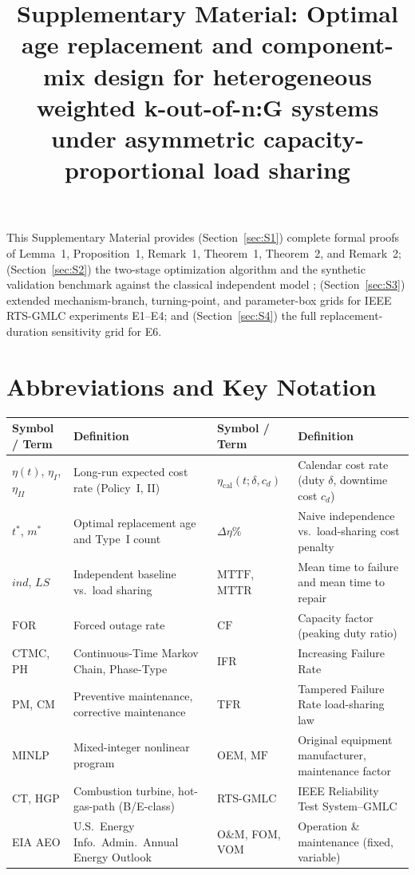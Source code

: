 \documentclass[10pt,a4paper]{article}
\title{\textbf{Supplementary Material: Optimal age replacement and component-mix design for heterogeneous weighted k-out-of-n:G systems under asymmetric capacity-proportional load sharing}}
\author{}
\date{}
\begin{document}
\maketitle

\noindent This Supplementary Material provides (Section~\ref{sec:S1}) complete formal proofs of Lemma~1, Proposition~1, Remark~1, Theorem~1, Theorem~2, and Remark~2; (Section~\ref{sec:S2}) the two-stage optimization algorithm and the synthetic validation benchmark against the classical independent model \cite{wu1994,nakagawa2005,eryilmaz2014two}; (Section~\ref{sec:S3}) extended mechanism-branch, turning-point, and parameter-box grids for IEEE RTS-GMLC experiments E1--E4; and (Section~\ref{sec:S4}) the full replacement-duration sensitivity grid for E6.

\section*{Abbreviations and Key Notation}
\begin{center}
\footnotesize
\begin{tabular*}{\textwidth}{@{\extracolsep{\fill}}ll|ll@{}}
\toprule
Symbol / Term & Definition & Symbol / Term & Definition \\
\midrule
$\eta(t)$, $\eta_I$, $\eta_{II}$ & Long-run expected cost rate (Policy~I, II) & $\eta_{\mathrm{cal}}(t;\delta,c_d)$ & Calendar cost rate (duty $\delta$, downtime cost $c_d$) \\
$t^*$, $m^*$ & Optimal replacement age and Type~I count & $\Delta\eta\%$ & Naive independence vs.\ load-sharing cost penalty \\
$ind$, $LS$ & Independent baseline vs.\ load sharing & $\mathrm{MTTF}$, $\mathrm{MTTR}$ & Mean time to failure and mean time to repair \\
$\mathrm{FOR}$ & Forced outage rate & $\mathrm{CF}$ & Capacity factor (peaking duty ratio) \\
CTMC, PH & Continuous-Time Markov Chain, Phase-Type & IFR & Increasing Failure Rate \\
PM, CM & Preventive maintenance, corrective maintenance & TFR & Tampered Failure Rate load-sharing law \\
MINLP & Mixed-integer nonlinear program & OEM, $\mathrm{MF}$ & Original equipment manufacturer, maintenance factor \\
CT, HGP & Combustion turbine, hot-gas-path (B/E-class) & RTS-GMLC & IEEE Reliability Test System--GMLC \\
EIA AEO & U.S.\ Energy Info.\ Admin.\ Annual Energy Outlook & O\&M, FOM, VOM & Operation \& maintenance (fixed, variable) \\
\bottomrule
\end{tabular*}
\end{center}
\end{document}
